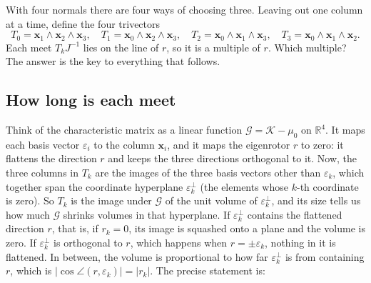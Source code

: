 \documentclass{birkjour}
\theoremstyle{definition}
\theoremstyle{remark}
\numberwithin{equation}{section}
\newcommand{\K}{\mathcal{K}}
\newcommand{\Gop}{\mathcal{G}}
\newcommand{\R}{\mathbb{R}}
\begin{document}
With four normals there are four ways of choosing three. Leaving out one column at a time, define the four trivectors
\begin{equation}
\label{eqn:trivectors}
T_0 = \mathbf x_1 \wedge \mathbf x_2 \wedge \mathbf x_3, \quad T_1 = \mathbf x_0 \wedge \mathbf x_2 \wedge \mathbf x_3, \quad T_2 = \mathbf x_0 \wedge \mathbf x_1 \wedge \mathbf x_3, \quad T_3 = \mathbf x_0 \wedge \mathbf x_1 \wedge \mathbf x_2.
\end{equation}
Each meet $T_k J^{-1}$ lies on the line of $r$, so it is a multiple of $r$. Which multiple? The answer is the key to everything that follows.

\subsection{How long is each meet}

Think of the characteristic matrix as a linear function $\Gop = \K - \mu_0$ on $\R^4$. It maps each basis vector $\varepsilon_i$ to the column $\mathbf x_i$, and it maps the eigenrotor $r$ to zero: it flattens the direction $r$ and keeps the three directions orthogonal to it. Now, the three columns in $T_k$ are the images of the three basis vectors other than $\varepsilon_k$, which together span the coordinate hyperplane $\varepsilon_k^\perp$ (the elements whose $k$-th coordinate is zero). So $T_k$ is the image under $\Gop$ of the unit volume of $\varepsilon_k^\perp$, and its size tells us how much $\Gop$ shrinks volumes in that hyperplane. If $\varepsilon_k^\perp$ contains the flattened direction $r$, that is, if $r_k = 0$, its image is squashed onto a plane and the volume is zero. If $\varepsilon_k^\perp$ is orthogonal to $r$, which happens when $r = \pm \varepsilon_k$, nothing in it is flattened. In between, the volume is proportional to how far $\varepsilon_k^\perp$ is from containing $r$, which is $|\cos \angle(r, \varepsilon_k)| = |r_k|$. The precise statement is:
\end{document}
